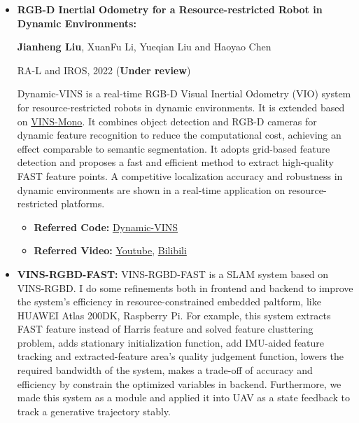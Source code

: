 \documentclass[11pt,a4paper,sans]{moderncv}        %
\begin{document}
{\vspace{6pt}

\begin{itemize}

\item \textbf{RGB-D Inertial Odometry for a Resource-restricted Robot in Dynamic Environments:} 

\textbf{Jianheng Liu}, XuanFu Li, Yueqian Liu and Haoyao Chen

RA-L and IROS, 2022 (\textbf{Under review})

Dynamic-VINS is a real-time RGB-D Visual Inertial Odometry (VIO) system for resource-restricted robots in dynamic environments. It is extended based on \href{https://github.com/HKUST-Aerial-Robotics/VINS-Mono}{VINS-Mono}. It combines object detection and RGB-D cameras for dynamic feature recognition to reduce the computational cost, achieving an effect comparable to semantic segmentation. It adopts grid-based feature detection and proposes a fast and efficient method to extract high-quality FAST feature points. A competitive localization accuracy and robustness in dynamic environments are shown in a real-time application on  resource-restricted platforms.

\begin{itemize}
\item \textbf{Referred Code:} \href{https://github.com/HITSZ-NRSL/Dynamic-VINS.git}{Dynamic-VINS}
\item \textbf{Referred Video:} \href{https://youtu.be/y0U1IVtFBwY}{Youtube}, \href{https://www.bilibili.com/video/BV1bF411t7mx}{Bilibili}
\end{itemize}
\vspace{6pt}

\item \textbf{VINS-RGBD-FAST:} VINS-RGBD-FAST is a SLAM system based on VINS-RGBD. I do some refinements both in frontend and backend to improve the system's efficiency in resource-constrained embedded paltform, like HUAWEI Atlas 200DK, Raspberry Pi. For example, this system extracts FAST feature instead of Harris feature and solved feature clusttering problem, adds stationary initialization function, add IMU-aided feature tracking and extracted-feature area's quality judgement function, lowers the required bandwidth of the system, makes a trade-off of accuracy and efficiency by constrain the optimized variables in backend. Furthermore, we made this system as a module and applied it into UAV as a state feedback to track a generative trajectory stably. 


\end{itemize}}
\end{document}
